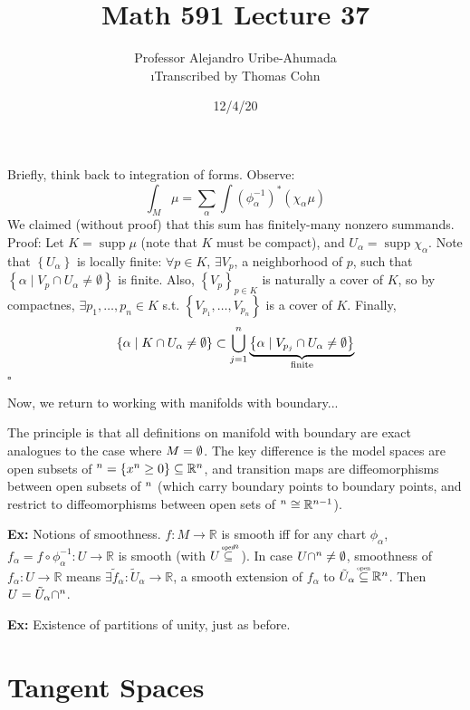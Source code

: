 \documentclass[10pt,letterpaper]{article}
\author{Professor Alejandro Uribe-Ahumada\\ \small\i{Transcribed by Thomas Cohn}}
\title{Math 591 Lecture 37}
\date{12/4/20} %
\newcommand{\n}{\hfill\break}
\newcommand{\nn}{\vspace{0.5\baselineskip}\n}
\newcommand{\hangblock}[2]{\par\noindent\settowidth{\hangindent}{\textbf{#1: }}\textbf{#1: }\nolinebreak#2}
\newcommand{\ex}[1]{\hangblock{Ex}{#1}}
\newcommand{\proven}{\;$\square$\n}
\newcommand{\ptxt}[1]{\textrm{\textnormal{#1}}}
\newcommand{\set}[1]{\left\{#1\right\}}
\newcommand{\reals}{\mathbb{R}}
\newcommand{\R}{\reals}
\newcommand{\halfPlane}{\mathbb{H}}
\let\H\relax
\newcommand{\H}{\halfPlane}
\newcommand{\osubseteq}{\overset{\mathclap{\scalebox{0.5}{\ptxt{open}}}}{\subseteq}}
\let\d\relax
\newcommand{\d}{\partial}
\newcommand{\inv}{^{-1}}
\newcommand{\of}{\circ}
\DeclareMathOperator{\supp}{supp}
\newcommand{\st}{s.t.}
\begin{document}
\maketitle
\setlength\RaggedRightParindent{\parindent}
\RaggedRight

\par\noindent
Briefly, think back to integration of forms. Observe:
\[
	\int_{M}\mu=\sum_{\alpha}\int(\phi_{\alpha}\inv)^{*}(\chi_{\alpha}\mu)
\]
We claimed (without proof) that this sum has finitely-many nonzero summands.\nn
Proof: Let $K=\supp\mu$ (note that $K$ must be compact), and $U_{\alpha}=\supp\chi_{\alpha}$. Note that $\set{U_{\alpha}}$ is locally finite: $\forall{}p\in{}K$, $\exists{}V_{p}$, a neighborhood of $p$, such that $\set{\alpha\mid{}V_{p}\cap{}U_{\alpha}\ne\emptyset}$ is finite. Also, $\set{V_{p}}_{p\in{}K}$ is naturally a cover of $K$, so by compactnes, $\exists{}p_{1},\ldots,p_{n}\in{}K$ \st{} $\set{V_{p_{1}},\ldots,V_{p_{n}}}$ is a cover of $K$. Finally,
\[
	\set{\alpha\mid{}K\cap{}U_{\alpha}\ne\emptyset}\subset\bigcup_{j=1}^{n}\underbrace{\set{\alpha\mid{}V_{p_{j}}\cap{}U_{\alpha}\ne\emptyset}}_{\ptxt{finite}}
\]
\proven

\par\noindent
Now, we return to working with manifolds with boundary...\n

\par\noindent
The principle is that all definitions on manifold with boundary are exact analogues to the case where $\d{}M=\emptyset$. The key difference is the model spaces are open subsets of $\H^{n}=\set{x^{n}\ge{}0}\subseteq\R^{n}$, and transition maps are diffeomorphisms between open subsets of $\H^{n}$ (which carry boundary points to boundary points, and restrict to diffeomorphisms between open sets of $\d\H^{n}\cong\R^{n-1}$).\n

\ex{
	Notions of smoothness. $f:M\to\R$ is smooth iff for any chart $\phi_{\alpha}$, $f_{\alpha}=f\of\phi_{\alpha}\inv:U\to\R$ is smooth (with $U\osubseteq\H^{n}$). In case $U\cap\d\H^{n}\ne\emptyset$, smoothness of $f_{\alpha}:U\to\R$ means $\exists\tilde{f}_{\alpha}:\tilde{U}_{\alpha}\to\R$, a smooth extension of $f_{\alpha}$ to $\tilde{U}_{\alpha}\osubseteq\R^{n}$. Then $U=\tilde{U}_{\alpha}\cap\H^{n}$.\n
}

\ex{
	Existence of partitions of unity, just as before.\n
}

\section*{Tangent Spaces}
\end{document}
